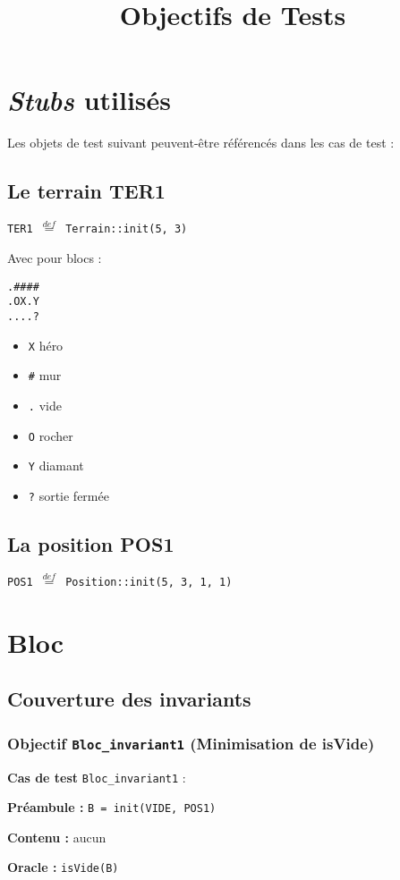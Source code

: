 \documentclass{article}
\title{Objectifs de Tests}
\author{}
\date{}
\newcommand{\cmd}[1]{\texttt{#1}}
\newcommand{\eqdef}{$\overset{def}{=}$}
\newcommand{\obj}[2]{\subsubsection*{\large{\textbf{Objectif {\cmd{#1} (#2)}}}}}
\newenvironment{cas}[1]
{
	\hspace{1em}\textbf{Cas de test} \cmd{#1} :
	\begin{list}{}{}
}{
	\end{list}
}
\newcommand{\pre}[1]{\item \textbf{Préambule :} \cmd{#1}}
\newcommand{\nope}{\item \textbf{Contenu :} aucun}
\newcommand{\ora}[1]{\item \textbf{Oracle :} \cmd{#1}}
\begin{document}
\maketitle{}

\section{\emph{Stubs} utilisés}

Les objets de test suivant peuvent-être référencés dans les cas de test :

\subsection{Le terrain TER1}

\cmd{TER1 \eqdef{} Terrain::init(5, 3)}

Avec pour blocs :

\begin{verbatim}
.####
.OX.Y
....?
\end{verbatim}

\begin{itemize}
	\item \cmd{X} héro
	\item \cmd{\#} mur
	\item \cmd{.} vide
	\item \cmd{O} rocher
	\item \cmd{Y} diamant
	\item \cmd{?} sortie fermée
\end{itemize}

\subsection{La position POS1}

\cmd{POS1 \eqdef{} Position::init(5, 3, 1, 1)}

\clearpage{}




\section{Bloc}

\subsection{Couverture des invariants}

\obj{Bloc\_invariant1} {Minimisation de isVide}

	\begin{cas}{Bloc\_invariant1}
		\pre{B = init(VIDE, POS1)}
		\nope{}
		\ora{isVide(B)}
	\end{cas}
\end{document}
